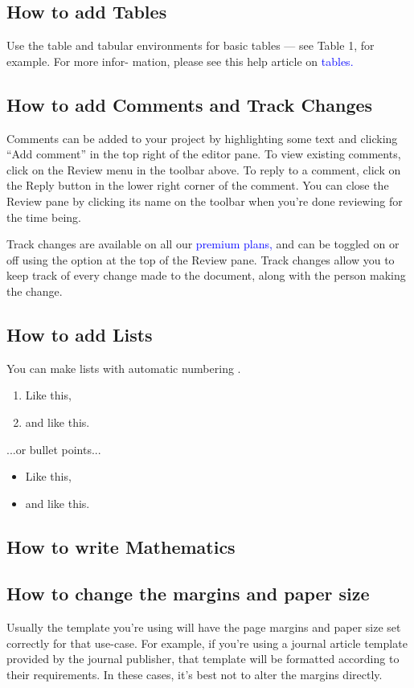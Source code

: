 \documentclass{article}
\begin{document}
 	   \subsection{How to add Tables}
 	   Use the table and tabular environments for basic tables — see Table 1, for example. For more infor-
 	   mation, please see this help article on \textcolor{blue}{tables.}
 	   \subsection{How to add Comments and Track Changes}
 	   Comments can be added to your project by highlighting some text and clicking “Add comment” in
 	   the top right of the editor pane. To view existing comments, click on the Review menu in the toolbar
 	   above. To reply to a comment, click on the Reply button in the lower right corner of the comment.
 	   You can close the Review pane by clicking its name on the toolbar when you’re done reviewing for the
 	   time being.
 	   
 	   Track changes are available on all our \textcolor{blue}{ premium plans,} and can be toggled on or off using the option
 	   at the top of the Review pane. Track changes allow you to keep track of every change made to the
 	   document, along with the person making the change.
 	   \subsection{How to add Lists}
 	   You can make lists with automatic numbering .
 	   \begin{enumerate}
 	   	
 	   \item Like this,
 	   \item and like this.
 	   
 	   \end{enumerate}
 	   ...or bullet points...
 	   \begin{itemize}

       \item Like this,
       \item and like this.
       \end{itemize}
       
       \subsection{How to write Mathematics} 
       \subsection{How to change the margins and paper size}	
        Usually the template you’re using will have the page margins and paper size set correctly for that
        use-case. For example, if you’re using a journal article template provided by the journal publisher,
        that template will be formatted according to their requirements. In these cases, it’s best not to alter
        the margins directly.
        
\end{document}
